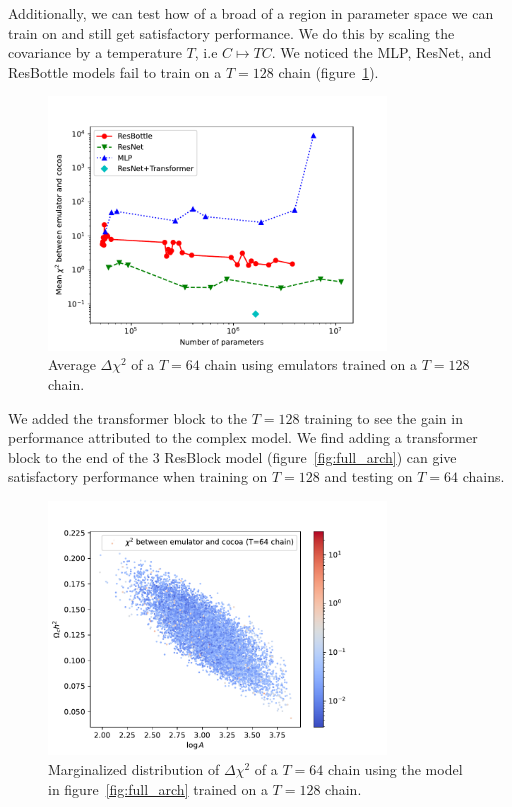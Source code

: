 Additionally, we can test how of a broad of a region in parameter space we can train on and still get satisfactory performance. We do this by scaling the covariance by a temperature $T$, i.e $C\mapsto TC$. We noticed the MLP, ResNet, and ResBottle models fail to train on a $T=128$ chain (figure~\ref{fig:avg_chi2_nparams_t128}).
\begin{figure}[!tb]
	\centering
	\includegraphics[width=0.8\textwidth]{plots/avg_chi2_v_n_params_T64.pdf}
	\caption{Average $\Delta\chi^2$ of a $T=64$ chain using emulators trained on a $T=128$ chain.}
	\label{fig:avg_chi2_nparams_t128}
\end{figure} 
We added the transformer block to the $T=128$ training to see the gain in performance attributed to the complex model. We find adding a transformer block to the end of the 3 ResBlock model (figure~\ref{fig:full_arch}) can give satisfactory performance when training on $T=128$ and testing on $T=64$ chains.
\begin{figure}[!tb]
	\centering
	\includegraphics[width=0.8\textwidth]{plots/T64_attention_stuff.pdf}
	\caption{Marginalized distribution of $\Delta\chi^2$ of a $T=64$ chain using the model in figure~\ref{fig:full_arch} trained on a $T=128$ chain.}
	\label{fig:testing_attention_t128}
\end{figure}

